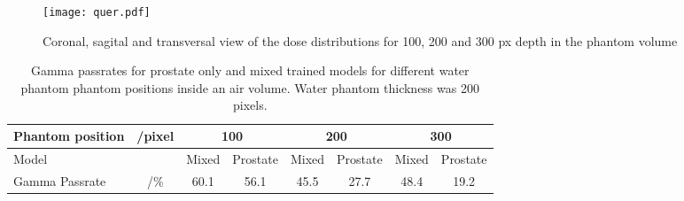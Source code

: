 \begin{figure}
    \centering
    \texttt{[image: quer.pdf]}
    \caption{Coronal, sagital and transversal view of the dose distributions for 100, 200 and 300 px depth in the phantom volume}\label{fig:phantom}
\end{figure}

\begin{table}
    \begin{tabular}{|lc|cc|cc|cc|}
    \hline
    Phantom position & /pixel & \multicolumn{2}{c|}{\textbf{100}} & \multicolumn{2}{c|}{\textbf{200}} & \multicolumn{2}{c|}{\textbf{300}} \\ \hline
    Model               &        & Mixed          & Prostate         & Mixed          & Prostate         & Mixed          & Prostate         \\
    Gamma Passrate      & /\%    & 60.1         & 56.1           & 45.5         & 27.7           & 48.4         & 19.2           \\ \hline
    \end{tabular}
    \caption{Gamma passrates for prostate only and mixed trained models for different water phantom phantom positions inside an air volume. Water phantom thickness was 200 pixels.}\label{tab:phantom_res}
\end{table}